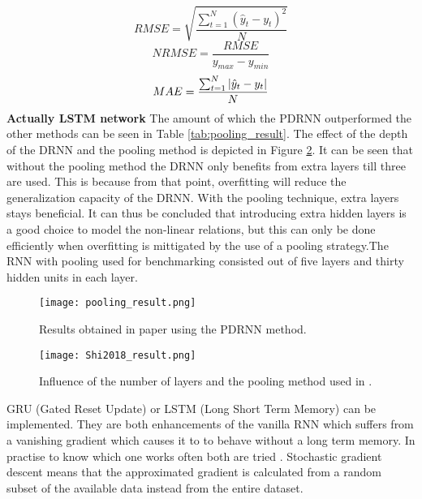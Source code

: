 \begin{equation}\label{eq:RMSE}
	RMSE = \sqrt{\frac{\sum_{t=1}^{N}(\hat{y}_t-y_t)^2}{N}}
\end{equation}
\begin{equation}\label{eq:NRMSE}
	NRMSE = \frac{RMSE}{y_{max}-y_{min}}
\end{equation}
\begin{equation}\label{eq:MAE}
	MAE = \frac{\sum_{t=1}^{N}\abs{\hat{y}_t-y_t}}{N}
\end{equation}
\textbf{Actually LSTM network}
The amount of which the PDRNN outperformed the other methods can be seen in Table \ref{tab:pooling_result}. The effect of the depth of the DRNN and the pooling method is depicted in Figure \ref{fig:Shi2018_result}. It can be seen that without the pooling method the DRNN only benefits from extra layers till three are used. This is because from that point, overfitting will reduce the generalization capacity of the DRNN. With the pooling technique, extra layers stays beneficial. It can thus be concluded that introducing extra hidden layers is a good choice to model the non-linear relations, but this can only be done efficiently when overfitting is mittigated by the use of a pooling strategy.The RNN with pooling used for benchmarking consisted out of five layers and thirty hidden units in each layer.

\begin{figure}[h!]
	\centering
	\texttt{[image: pooling\_result.png]}
	\caption{Results obtained in paper \cite{Shi2018} using the PDRNN method.}
	\label{fig:Shi2018_result}
\end{figure}

\begin{figure}[h!]
	\centering
	\texttt{[image: Shi2018\_result.png]}
	\caption{Influence of the number of layers and the pooling method used in \cite{Shi2018}.}
	\label{fig:Shi2018_result}
\end{figure}

GRU (Gated Reset Update) or LSTM (Long Short Term Memory) can be implemented. They are both enhancements of the vanilla RNN which suffers from a vanishing gradient which causes it to to behave without a long term memory. In practise to know which one works often both are tried \cite{Teuwen2019}. Stochastic gradient descent means that the approximated gradient is calculated from a random subset of the available data instead from the entire dataset. \\

